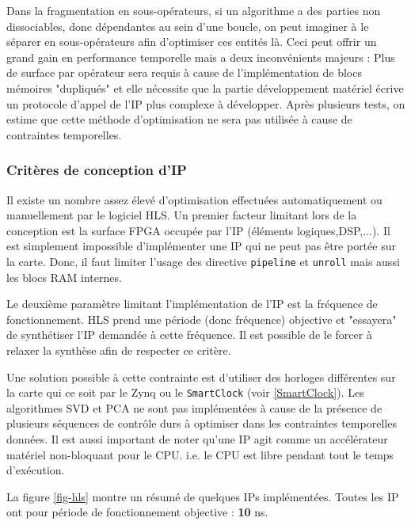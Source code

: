 \documentclass[12pt,a4paper]{article}
\begin{document}
Dans la fragmentation en sous-opérateurs, si un algorithme a des parties non dissociables, donc dépendantes au sein d'une boucle, on peut imaginer à le séparer en sous-opérateurs afin d'optimiser ces entités là. Ceci peut offrir un grand gain en performance temporelle mais a deux inconvénients majeurs : Plus de surface par opérateur sera requis à cause de l'implémentation de blocs mémoires "dupliqués" et elle nécessite que la partie développement matériel écrive un protocole d'appel de l'IP plus complexe à développer. Après plusieurs tests, on estime que cette méthode d'optimisation ne sera pas utilisée à cause de contraintes temporelles.

\subsubsection{Critères de conception d'IP}
Il existe un nombre assez élevé d'optimisation effectuées automatiquement ou manuellement par le logiciel HLS. Un premier facteur limitant lors de la conception est la surface FPGA occupée par l'IP (éléments logiques,DSP,...). Il est simplement impossible d'implémenter une IP qui ne peut pas être portée sur la carte. Donc, il faut limiter l'usage des directive \texttt{pipeline} et \texttt{unroll} mais aussi les blocs RAM internes.

Le deuxième paramètre limitant l'implémentation de l'IP est la fréquence de fonctionnement. HLS prend une période (donc fréquence) objective et "essayera" de synthétiser l'IP demandée à cette fréquence. Il est possible de le forcer à relaxer la synthèse afin de respecter ce critère.

Une solution possible à cette contrainte est d'utiliser des horloges différentes sur la carte qui ce soit par le Zynq ou le \texttt{SmartClock} (voir \ref{SmartClock}). Les algorithmes SVD et PCA ne sont pas implémentées à cause de la présence de plusieurs séquences de contrôle durs à optimiser dans les contraintes temporelles données. Il est aussi important de noter qu'une IP agit comme un accélérateur matériel non-bloquant pour le CPU. i.e. le CPU est libre pendant tout le temps d'exécution.

La figure \ref{fig-hls} montre un résumé de quelques IPs implémentées. Toutes les IP ont pour période de fonctionnement objective : \textbf{10} ns.
\end{document}
